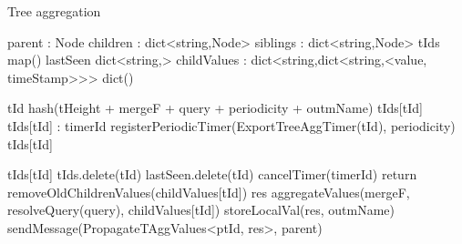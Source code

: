 \begin{algorithm}
\caption{Tree aggregation} \label{alg:mon:tree_agg}
\begin{algorithmic}[1]

    \asdstate \label{alg:mon:tree_agg:state}
    \State parent : Node  
    \State children : dict<string,Node>  
    \State siblings : dict<string,Node>   
        \State tIds \asdassign map()
        \State lastSeen \asdassign dict<string,>
        \State childValues : dict<string,dict<string,<value, timeStamp>>> \asdassign dict()
    \asdend

    \label{alg:mon:tree_agg:start_req}
        \State tId \asdassign hash(tHeight + mergeF + query + periodicity + outmName) \label{alg:mon:tree_agg:start_req_start}
            \State <tHeight, mergeF, query, periodicity, outmName, timerId, isLocal, isParentSub, ptId> \asdassign tIds[tId]
            \State tIds[tId] \asdassign <tHeight, mergeF, query, periodicity, outmName, timerId, true, isParentSub, ptId>
        \Else:
        \State timerId \asdassign registerPeriodicTimer(ExportTreeAggTimer(tId), periodicity)
        \State tIds[tId] \asdassign <tHeight, mergeF, query, periodicity, outmName, timerId, true, false, nil>
        \EndIf\label{alg:mon:tree_agg:start_req_end}
    \asdend

     \label{alg:mon:tree_agg:export_trigger}
        \State <tHeight, mergeF, query, periodicity, outmName, timerId, isLocal, isParentSub, ptId> \asdassign tIds[tId]
                \State tIds.delete(tId)
                \State lastSeen.delete(tId)
                \State cancelTimer(timerId)
                \State return
            \EndIf
        \EndIf
        \State removeOldChildrenValues(childValues[tId])
        \State res \asdassign aggregateValues(mergeF, resolveQuery(query), childValues[tId])
            \State storeLocalVal(res, outmName)
        \EndIf 
            \State sendMessage(PropagateTAggValues<ptId, res>, parent)
        \EndIf
    \asdend


\end{algorithmic}
\end{algorithm}
